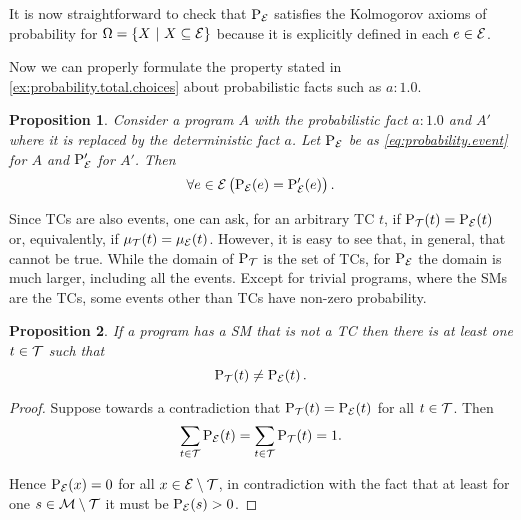 \documentclass[a4paper]{article}
\newtheorem{proposition}{Proposition}
\newtheorem{proposition}{Proposition}
\newtheorem{proof}{Proof}
\newcommand{\at}[1]{\ensuremath{\!\del{#1}}}        %
\newcommand{\cla}[1]{\ensuremath{{\cal #1}}}        %
\newcommand{\TCHOICEset}{\ensuremath{\cla{T}}}
\newcommand{\MODELset}{\ensuremath{\cla{M}}}
\newcommand{\EVENTSset}{\ensuremath{\cla{E}}}
\newcommand{\prfunc}{\ensuremath{\mathrm{P}}}
\newcommand{\prd}[1]{\ensuremath{\prfunc_{#1}}}
\newcommand{\prT}{\prd{\TCHOICEset}}
\newcommand{\prE}{\prd{\EVENTSset}}
\newcommand{\pwT}{\ensuremath{\mu_{\TCHOICEset}}}
\newcommand{\pwt}[1]{\ensuremath{\pwT\at{#1}}}
\newcommand{\pwE}{\ensuremath{\mu_{\EVENTSset}}}
\newcommand{\pwe}[1]{\ensuremath{\pwE\at{#1}}}
\newcommand{\given}{\ensuremath{~\middle|~}}
\newcommand{\probfact}[2]{\ensuremath{#1:#2}}
\newcommand{\franc}[1]{{\color{green!30!black}#1}}
\begin{document}
It is now straightforward to check that \(\prE\) satisfies the
Kolmogorov axioms of probability for
\(\Omega = \set{X \given X \subseteq \EVENTSset}\) because it is
explicitly defined in each \(e\in\EVENTSset\).

\franc{ Now we can properly formulate the property stated in
  \cref{ex:probability.total.choices} about probabilistic facts such
  as \(\probfact{a}{1.0}\).
    \begin{proposition}\label{prop:prob.one}
        Consider a program $A$ with the probabilistic fact \(\probfact{a}{1.0}\) and $A'$ where it is replaced by the deterministic fact \(a\).  Let \(\prE\) be as \cref{eq:probability.event} for $A$ and \(\prfunc'_{\EVENTSset}\) for $A'$.  Then
        \begin{equation}
            \forall e \in \EVENTSset \left(\prE\at{e} = \prfunc'_{\EVENTSset}\at{e}\right).
        \end{equation}
    \end{proposition}
}

Since \aclp{TC} are also events, one can ask, for an arbitrary
\acl{TC} \(t\), if \(\prT\at{t} = \prE\at{t}\) or, equivalently, if
\(\pwt{t} = \pwe{t}\).  However, it is easy to see that, in general,
that cannot be true.  While the domain of \(\prT\) is the set of
\aclp{TC}, for \(\prE\) the domain is much larger, including all the
events.  Except for trivial programs, where the \acp{SM} are the
\acp{TC}, some events other than \aclp{TC} have non-zero probability.

\begin{proposition} \label{prop:two.distributions} %
    If a program has a \acl{SM} that is not a \acl{TC} then there is at least one \(t\in\TCHOICEset\) such that
    \begin{equation}
        \prT\at{t} \not= \prE\at{t}. \label{eq:two.distributions}
    \end{equation}
\end{proposition}

\begin{proof}
    Suppose towards a contradiction that \(\prT\at{t} = \prE\at{t}\) for all \(t \in \TCHOICEset\).  Then \[
        \sum_{t\in\TCHOICEset} \prE\at{t} = \sum_{t\in\TCHOICEset} \prT\at{t} = 1.
    \]

    Hence \(\prE\at{x} = 0\) for all
    \(x \in \EVENTSset\setminus\TCHOICEset\), in contradiction with
    the fact that at least for one
    \(s \in \MODELset\setminus\TCHOICEset\) it must be
    \(\prE\at{s} > 0\).
\end{proof}
\end{document}
